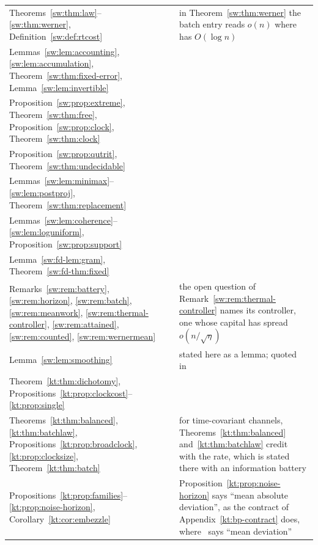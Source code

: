 \begin{small}
\begin{longtable}{@{}>{\raggedright\arraybackslash}p{}>{\raggedright\arraybackslash}p{}>{\raggedright\arraybackslash}p{}@{}}
Theorems~\ref{sw:thm:law}--\ref{sw:thm:werner}, Definition~\ref{sw:def:rtcost} & \cite[Thms.~1--3, Def.~1]{SaveWork} & in Theorem~\ref{sw:thm:werner} the batch entry reads $o(n)$ where~\cite{SaveWork} has $O(\log n)$\\
Lemmas~\ref{sw:lem:accounting}, \ref{sw:lem:accumulation}, Theorem~\ref{sw:thm:fixed-error}, Lemma~\ref{sw:lem:invertible} & \cite[Lemmas~4, 5, Thm.~6, Lemma~7]{SaveWork} & \\
Proposition~\ref{sw:prop:extreme}, Theorem~\ref{sw:thm:free}, Proposition~\ref{sw:prop:clock}, Theorem~\ref{sw:thm:clock} & \cite[Prop.~8, Thm.~9, Prop.~10, Thm.~11]{SaveWork} & \\
Proposition~\ref{sw:prop:qutrit}, Theorem~\ref{sw:thm:undecidable} & \cite[Prop.~12, Thm.~13]{SaveWork} & \\
Lemmas~\ref{sw:lem:minimax}--\ref{sw:lem:postproj}, Theorem~\ref{sw:thm:replacement} & \cite[Lemmas~14--17, Thm.~18]{SaveWork} & \\
Lemmas~\ref{sw:lem:coherence}--\ref{sw:lem:loguniform}, Proposition~\ref{sw:prop:support} & \cite[Lemmas~19--21, Prop.~22]{SaveWork} & \\
Lemma~\ref{sw:fd-lem:gram}, Theorem~\ref{sw:fd-thm:fixed} & \cite[Lemma~23, Thm.~24]{SaveWork} & \\
Remarks~\ref{sw:rem:battery}, \ref{sw:rem:horizon}, \ref{sw:rem:batch}, \ref{sw:rem:meanwork}, \ref{sw:rem:thermal-controller}, \ref{sw:rem:attained}, \ref{sw:rem:counted}, \ref{sw:rem:wernermean} & \cite[Remarks~1--8]{SaveWork} & the open question of Remark~\ref{sw:rem:thermal-controller} names its controller, one whose capital has spread $o(n/\sqrt\eta)$\\
Lemma~\ref{sw:lem:smoothing} & \cite[Thm.~4.1, Cor.~4.3]{Douglas26closed} & stated here as a lemma; quoted in~\cite{SaveWork}\\
Theorem~\ref{kt:thm:dichotomy}, Propositions~\ref{kt:prop:clockcost}--\ref{kt:prop:single} & \cite[Thm.~1, Props.~2--5]{KeepingTime} & \\
Theorems~\ref{kt:thm:balanced}, \ref{kt:thm:batchlaw}, Propositions~\ref{kt:prop:broadclock}, \ref{kt:prop:clocksize}, Theorem~\ref{kt:thm:batch} & \cite[Thms.~6, 7, Props.~8, 9, Thm.~10]{KeepingTime} & for time-covariant channels, Theorems~\ref{kt:thm:balanced} and~\ref{kt:thm:batchlaw} credit~\cite{FBB21} with the rate, which is stated there with an information battery\\
Propositions~\ref{kt:prop:families}--\ref{kt:prop:noise-horizon}, Corollary~\ref{kt:cor:embezzle} & \cite[Props.~11--16, Cor.~17]{KeepingTime} & Proposition~\ref{kt:prop:noise-horizon} says ``mean absolute deviation'', as the contract of Appendix~\ref{kt:bp-contract} does, where~\cite[Prop.~16]{KeepingTime} says ``mean deviation''\\

\end{longtable}
\end{small}
